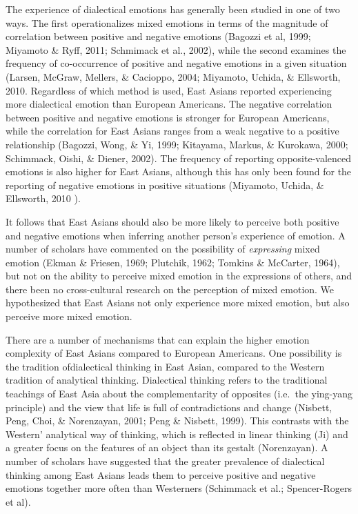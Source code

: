 \documentclass[english,man]{apa6}
\begin{document}
The experience of dialectical emotions has generally been studied in one
of two ways. The first operationalizes mixed emotions in terms of the
magnitude of correlation between positive and negative emotions (Bagozzi
et al, 1999; Miyamoto \& Ryff, 2011; Schmimack et al., 2002), while the
second examines the frequency of co-occurrence of positive and negative
emotions in a given situation (Larsen, McGraw, Mellers, \& Cacioppo,
2004; Miyamoto, Uchida, \& Ellsworth, 2010. Regardless of which method
is used, East Asians reported experiencing more dialectical emotion than
European Americans. The negative correlation between positive and
negative emotions is stronger for European Americans, while the
correlation for East Asians ranges from a weak negative to a positive
relationship (Bagozzi, Wong, \& Yi, 1999; Kitayama, Markus, \& Kurokawa,
2000; Schimmack, Oishi, \& Diener, 2002). The frequency of reporting
opposite-valenced emotions is also higher for East Asians, although this
has only been found for the reporting of negative emotions in positive
situations (Miyamoto, Uchida, \& Ellsworth, 2010 ).

It follows that East Asians should also be more likely to perceive both
positive and negative emotions when inferring another person's
experience of emotion. A number of scholars have commented on the
possibility of \emph{expressing} mixed emotion (Ekman \& Friesen, 1969;
Plutchik, 1962; Tomkins \& McCarter, 1964), but not on the ability to
perceive mixed emotion in the expressions of others, and there been no
cross-cultural research on the perception of mixed emotion. We
hypothesized that East Asians not only experience more mixed emotion,
but also perceive more mixed emotion.

There are a number of mechanisms that can explain the higher emotion
complexity of East Asians compared to European Americans. One
possibility is the tradition ofdialectical thinking in East Asian,
compared to the Western tradition of analytical thinking. Dialectical
thinking refers to the traditional teachings of East Asia about the
complementarity of opposites (i.e.~the ying-yang principle) and the view
that life is full of contradictions and change (Nisbett, Peng, Choi, \&
Norenzayan, 2001; Peng \& Nisbett, 1999). This contrasts with the
Western' analytical way of thinking, which is reflected in linear
thinking (Ji) and a greater focus on the features of an object than its
gestalt (Norenzayan). A number of scholars have suggested that the
greater prevalence of dialectical thinking among East Asians leads them
to perceive positive and negative emotions together more often than
Westerners (Schimmack et al.; Spencer-Rogers et al).
\end{document}
